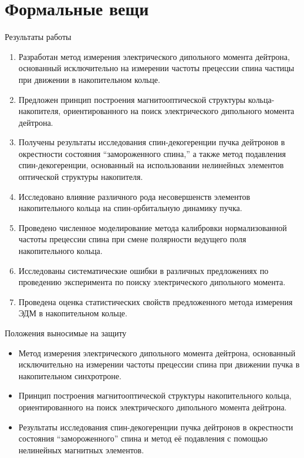 \documentclass[14pt]{beamer}
\begin{document}
\section{Формальные вещи}
\begin{frame}{Результаты работы}
	\begin{enumerate}
		\item Разработан метод измерения электрического дипольного момента дейтрона, 
		основанный исключительно на измерении частоты прецессии спина частицы 
		при движении в накопительном кольце.
		\item Предложен принцип построения магнитооптической структуры кольца-накопителя, 
		ориентированного на поиск электрического дипольного момента дейтрона.
	\end{enumerate}
\end{frame}
\begin{frame}
	\begin{enumerate}\setcounter{enumi}{2}
		\item Получены результаты исследования спин-декогеренции пучка дейтронов в окрестности 
		состояния ``замороженного спина,'' а также метод подавления спин-декогеренции, основанный на использовании нелинейных элементов оптической структуры накопителя.
		\item Исследовано влияние различного рода несовершенств элементов накопительного кольца 
		на спин-орбитальную динамику пучка.
	\end{enumerate}
\end{frame}
\begin{frame}
	\begin{enumerate}\setcounter{enumi}{4}
		\item Проведено численное моделирование метода калибровки нормализованной частоты прецессии спина 
		при смене полярности ведущего поля накопительного кольца.
		\item Исследованы систематические ошибки в различных предложениях по проведению эксперимента 
		по поиску электрического дипольного момента.
		\item Проведена оценка статистических свойств предложенного метода измерения 
		ЭДМ в накопительном кольце.
	\end{enumerate}
\end{frame}
\begin{frame}{Положения выносимые на защиту}
	\begin{itemize}
		\item Метод измерения электрического дипольного момента дейтрона, основанный исключительно на измерении частоты прецессии спина при движении пучка в накопительном синхротроне.
		\item Принцип построения магнитооптической структуры накопительного кольца, ориентированного на поиск электрического дипольного момента дейтрона.
		\item Результаты исследования спин-декогеренции пучка дейтронов в окрестности состояния ``замороженного'' спина и метод её подавления с помощью нелинейных магнитных элементов.
	\end{itemize}
\end{frame}
\end{document}
